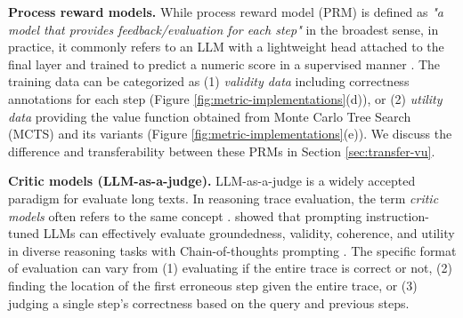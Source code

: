
\textbf{Process reward models.} While process reward model (PRM) is defined as \textit{"a model that provides feedback/evaluation for each step"} in the broadest sense, in practice, it commonly refers to an LLM with a lightweight head attached to the final layer and trained to predict a numeric score in a supervised manner \citep{DBLP:conf/iclr/LightmanKBEBLLS24, wang-etal-2024-math, setlur2024rewardingprogressscalingautomated}. The training data can be categorized as (1) \textit{validity data} including correctness annotations for each step \citep{NEURIPSDnB2021_be83ab3e} (Figure \ref{fig:metric-implementations}(d)), or (2) \textit{utility data} \citep{wang-etal-2024-math} providing the value function obtained from Monte Carlo Tree Search (MCTS) and its variants (Figure \ref{fig:metric-implementations}(e)). We discuss the difference and transferability between these PRMs in Section \ref{sec:transfer-vu}.

\textbf{Critic models (LLM-as-a-judge).} LLM-as-a-judge \citep{NEURIPS2023_91f18a12, DBLP:conf/iclr/KimS0JLLYSKTS24} is a widely accepted paradigm for evaluate long texts. In reasoning trace evaluation, the term \textit{critic models} often refers to the same concept \citep{zheng2024processbenchidentifyingprocesserrors, lin2024criticbenchbenchmarkingllmscritiquecorrect}. \citet{jacovi-etal-2024-chain, wu-etal-2024-mitigating, niu2024ragtruthhallucinationcorpusdeveloping, NEURIPS2023_271db992} showed that prompting instruction-tuned LLMs can effectively evaluate groundedness, validity, coherence, and utility in diverse reasoning tasks with Chain-of-thoughts prompting \citep{NEURIPS2022_9d560961}. The specific format of evaluation can vary from (1) evaluating if the entire trace is correct or not, (2) finding the location of the first erroneous step given the entire trace, or (3) judging a single step's correctness based on the query and previous steps.


